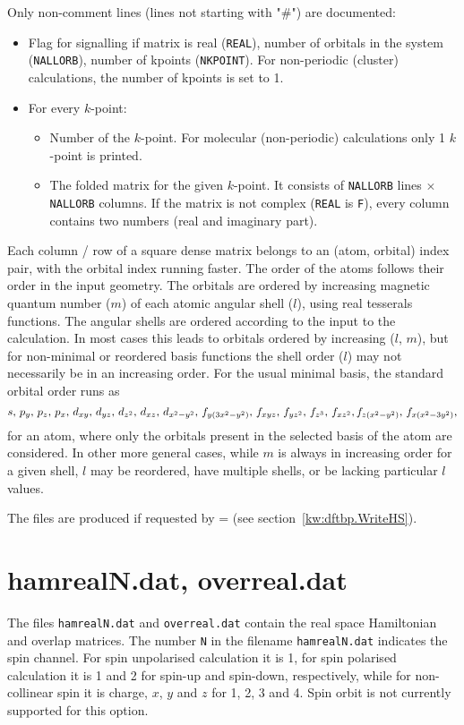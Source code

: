 Only non-comment lines (lines not starting with "\#") are documented:
\begin{itemize}

\item Flag for signalling if matrix is real (\verb|REAL|), number of
  orbitals in the system (\verb|NALLORB|), number of kpoints
  (\verb|NKPOINT|). For non-periodic (cluster) calculations, the
  number of kpoints is set to 1.

\item For every $k$-point:
  \begin{itemize}
  \item Number of the $k$-point. For molecular (non-periodic)
    calculations only 1 $k$-point is printed.
  \item The folded matrix for the given $k$-point. It consists of
    \verb|NALLORB| lines $\times$ \verb|NALLORB| columns. If the
    matrix is not complex (\verb|REAL| is \verb|F|), every column
    contains two numbers (real and imaginary part).
  \end{itemize}
\end{itemize}

Each column / row of a square dense matrix belongs to an (atom, orbital) index
pair, with the orbital index running faster. The order of the atoms follows
their order in the input geometry. The orbitals are ordered by increasing
magnetic quantum number ($m$) of each atomic angular shell ($l$), using real
tesserals functions. The angular shells are ordered according to the input to
the calculation. In most cases this leads to orbitals ordered by increasing
($l$, $m$), but for non-minimal or reordered basis functions the shell order
($l$) may not necessarily be in an increasing order. For the usual minimal
basis, the standard orbital order runs as
\begin{equation*}
  s,\, p_y,\, p_z,\, p_x,\, d_{xy},\, d_{yz},\, d_{z^2},\, d_{xz},\,
  d_{x^2-y^2},\, f_{y(3x^2-y^2)},\, f_{xyz},\, f_{yz^2},\, f_{z^3},\, f_{xz^2},
  f_{z(x^2-y^2)},\, f_{x(x^2-3y^2)} \text,
\end{equation*}
for an atom, where only the orbitals present in the selected basis of the atom
are considered. In other more general cases, while $m$ is always in increasing
order for a given shell, $l$ may be reordered, have multiple shells, or be
lacking particular $l$ values.

The files are produced if requested by  =  (see
section~\ref{kw:dftbp.WriteHS}).

\section{hamrealN.dat, overreal.dat}
\label{sec:hamreal}
 The files \verb|hamrealN.dat|
and \verb|overreal.dat| contain the real space Hamiltonian and overlap
matrices. The number \verb|N| in the filename \verb|hamrealN.dat|
indicates the spin channel. For spin unpolarised calculation it is 1,
for spin polarised calculation it is 1 and 2 for spin-up and
spin-down, respectively, while for non-collinear spin it is charge,
$x$, $y$ and $z$ for 1, 2, 3 and 4. Spin orbit is not currently
supported for this option.

